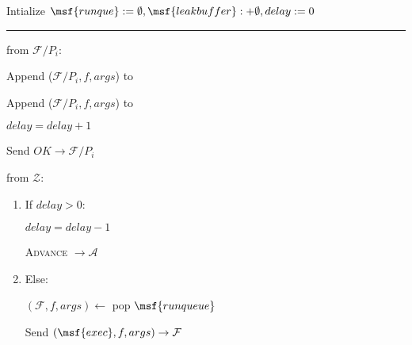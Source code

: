\begin{bbox}[title={\textbf{Wrapper} $\mathcal{W}_{\msf{async}}$} ] 

Intialize $\msf{runque} := \emptyset, \msf{leakbuffer} :+ \emptyset, delay := 0$

\vspace{2mm} \hrule \vspace{2mm}

\OnInput {} from $\mathcal{F}/P_i$:
	\begin{renumerate}
		\item Append ($\mathcal{F}/P_i, f, args$) to 
		\item Append ($\mathcal{F}/P_i, f, args$) to 
		\item $delay = delay + 1$
		\item Send $OK \rightarrow \mathcal{F}/P_i$
	\end{renumerate}

\OnInput {} from $\mathcal{Z}$:
	\begin{enumerate}
		\item If $delay > 0$:

			\quad  $delay = delay - 1$

			\quad  \Send \textsc{Advance} $\rightarrow \mathcal{A}$
		\item Else:
			
			\quad $(\mathcal{F}, f, args) \leftarrow$ pop $\msf{runqueue}$

			\quad Send $(\msf{exec}, f, args) \rightarrow \mathcal{F}$
	\end{enumerate}
\end{bbox}
